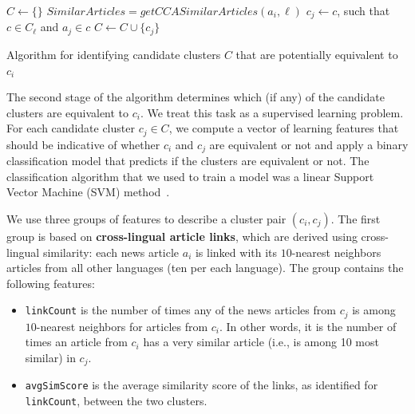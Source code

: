 \begin{algorithm}[t!]
$C \leftarrow \{\}$\;
 {
     {
        $SimilarArticles = getCCASimilarArticles(a_i, \ell)$\;
         {
            $c_j \leftarrow c$, such that $c \in C_\ell$ and $a_j \in c$\;
            $C \leftarrow C \cup \{ c_j \}$\;
        }
    }
}
\caption{Algorithm for identifying candidate clusters $C$ that are potentially equivalent to $c_i$}
\label{cluster_merge_algo1}
\end{algorithm}

The second stage of the algorithm determines which (if any) of the candidate clusters are equivalent to $c_i$.
We treat this task as a supervised learning problem. For each candidate cluster $c_j \in C$, we compute
a vector of learning features that should be indicative of whether $c_i$ and $c_j$ are equivalent or not
and apply a binary classification model that predicts if the clusters are equivalent or not. The classification
algorithm that we used to train a model was a linear Support Vector Machine (SVM) method~\cite{shawe-taylor04kernel}.

We use three groups of features to describe a cluster pair $(c_i, c_j)$. The first group is based
on {\bf cross-lingual article links}, which are derived using cross-lingual similarity:
each news article $a_i$ is linked with its $10$-nearest neighbors articles from all other
languages (ten per each language). The group contains the following features:

\begin{itemize}
\item \texttt{linkCount} is the number of times any of the news articles from $c_j$ is among $10$-nearest neighbors for articles from $c_i$. In other words, it is the number of times an article from $c_i$ has a very similar article (i.e., is among 10 most similar) in $c_j$.
\item \texttt{avgSimScore} is the average similarity score of the links, as identified for \texttt{linkCount}, between the two clusters.
\end{itemize}

